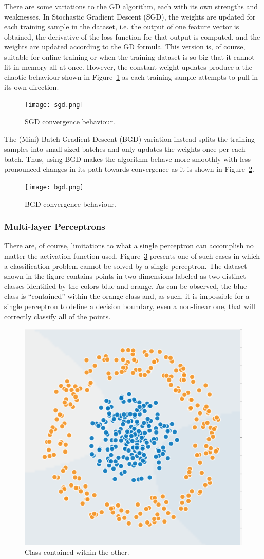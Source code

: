 There are some variations to the GD algorithm, each with its own strengths and
weaknesses. In Stochastic Gradient Descent (SGD), the weights are updated for
each training sample in the dataset, i.e. the output of one feature vector is
obtained, the derivative of the loss function for that output is computed, and
the weights are updated according to the GD formula. This version is, of course,
suitable for online training or when the training dataset is so big that it
cannot fit in memory all at once. However, the constant weight updates produce a
the chaotic behaviour shown in Figure~\ref{fig:sgd} as each training sample
attempts to pull in its own direction.

\begin{figure}[!htbp]
    \centering
    \texttt{[image: sgd.png]}
    \caption{SGD convergence behaviour.}
    \label{fig:sgd}
\end{figure}

The (Mini) Batch Gradient Descent (BGD) variation instead splits the training
samples into small-sized batches and only updates the weights once per each
batch. Thus, using BGD makes the algorithm behave more smoothly with less
pronounced changes in its path towards convergence as it is shown in
Figure~\ref{fig:bgd}.

\begin{figure}[!htbp]
    \centering
    \texttt{[image: bgd.png]}
    \caption{BGD convergence behaviour.}
    \label{fig:bgd}
\end{figure}

\subsubsection{Multi-layer Perceptrons}

There are, of course, limitations to what a single perceptron can accomplish no
matter the activation function used. Figure~\ref{fig:unsolvable} presents one of
such cases in which a classification problem cannot be solved by a single
perceptron. The dataset shown in the figure contains points in two dimensions
labeled as two distinct classes identified by the colors blue and orange. As can
be observed, the blue class is ``contained'' within the orange class and, as
such, it is impossible for a single perceptron to define a decision boundary,
even a non-linear one, that will correctly classify all of the points. 

\begin{figure}[!htbp]
    \centering
    \includegraphics[width=.35\textwidth]{Images/circles.png}
    \caption{Class contained within the other.}
    \label{fig:unsolvable}
\end{figure}

